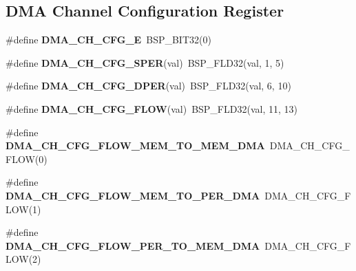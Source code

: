 \subsection*{D\+MA Channel Configuration Register}
\begin{DoxyCompactItemize}
\item 
\mbox{\label{group__lpc__dma_gaa91c2c45d2a5e397c98a222ac8fd1a22}} 
\#define {\bfseries D\+M\+A\+\_\+\+C\+H\+\_\+\+C\+F\+G\+\_\+E}~B\+S\+P\+\_\+\+B\+I\+T32(0)
\item 
\mbox{\label{group__lpc__dma_ga4ac8728c2f21ee631ef89de4e5fb99a6}} 
\#define {\bfseries D\+M\+A\+\_\+\+C\+H\+\_\+\+C\+F\+G\+\_\+\+S\+P\+ER}(val)~B\+S\+P\+\_\+\+F\+L\+D32(val, 1, 5)
\item 
\mbox{\label{group__lpc__dma_gacbc4100e78050163570daf1d59bdaf4d}} 
\#define {\bfseries D\+M\+A\+\_\+\+C\+H\+\_\+\+C\+F\+G\+\_\+\+D\+P\+ER}(val)~B\+S\+P\+\_\+\+F\+L\+D32(val, 6, 10)
\item 
\mbox{\label{group__lpc__dma_ga3b6e22bbf8632e1a3249b36d372ae8dd}} 
\#define {\bfseries D\+M\+A\+\_\+\+C\+H\+\_\+\+C\+F\+G\+\_\+\+F\+L\+OW}(val)~B\+S\+P\+\_\+\+F\+L\+D32(val, 11, 13)
\item 
\mbox{\label{group__lpc__dma_gaa88c203a10097c046175d3910df85759}} 
\#define {\bfseries D\+M\+A\+\_\+\+C\+H\+\_\+\+C\+F\+G\+\_\+\+F\+L\+O\+W\+\_\+\+M\+E\+M\+\_\+\+T\+O\+\_\+\+M\+E\+M\+\_\+\+D\+MA}~D\+M\+A\+\_\+\+C\+H\+\_\+\+C\+F\+G\+\_\+\+F\+L\+OW(0)
\item 
\mbox{\label{group__lpc__dma_gae7ef3479f66fe74255d969f704726ff8}} 
\#define {\bfseries D\+M\+A\+\_\+\+C\+H\+\_\+\+C\+F\+G\+\_\+\+F\+L\+O\+W\+\_\+\+M\+E\+M\+\_\+\+T\+O\+\_\+\+P\+E\+R\+\_\+\+D\+MA}~D\+M\+A\+\_\+\+C\+H\+\_\+\+C\+F\+G\+\_\+\+F\+L\+OW(1)
\item 
\mbox{\label{group__lpc__dma_ga2e4b16b7873e06d8a75c1c65dad1216a}} 
\#define {\bfseries D\+M\+A\+\_\+\+C\+H\+\_\+\+C\+F\+G\+\_\+\+F\+L\+O\+W\+\_\+\+P\+E\+R\+\_\+\+T\+O\+\_\+\+M\+E\+M\+\_\+\+D\+MA}~D\+M\+A\+\_\+\+C\+H\+\_\+\+C\+F\+G\+\_\+\+F\+L\+OW(2)
\item 
\mbox{\label{group__lpc__dma_ga5c152102a6c869ac1bfd93ec20f5f32e}} 

\end{DoxyCompactItemize}
